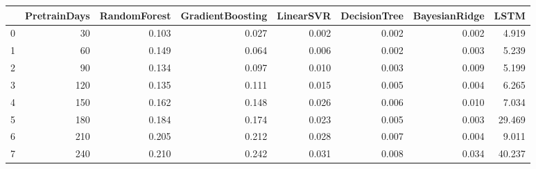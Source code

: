 \begin{tabular}{lrrrrrrr}
\toprule
{} &  PretrainDays &  RandomForest &  GradientBoosting &  LinearSVR &  DecisionTree &  BayesianRidge &   LSTM \\
\midrule
0 &            30 &         0.103 &             0.027 &      0.002 &         0.002 &          0.002 &  4.919 \\
1 &            60 &         0.149 &             0.064 &      0.006 &         0.002 &          0.003 &  5.239 \\
2 &            90 &         0.134 &             0.097 &      0.010 &         0.003 &          0.009 &  5.199 \\
3 &           120 &         0.135 &             0.111 &      0.015 &         0.005 &          0.004 &  6.265 \\
4 &           150 &         0.162 &             0.148 &      0.026 &         0.006 &          0.010 &  7.034 \\
5 &           180 &         0.184 &             0.174 &      0.023 &         0.005 &          0.003 & 29.469 \\
6 &           210 &         0.205 &             0.212 &      0.028 &         0.007 &          0.004 &  9.011 \\
7 &           240 &         0.210 &             0.242 &      0.031 &         0.008 &          0.034 & 40.237 \\
\bottomrule
\end{tabular}
